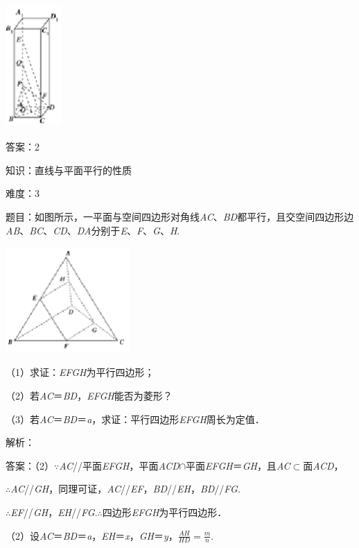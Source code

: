 \documentclass{article} %
\begin{document}
\includegraphics*[width=0.83in, height=1.85in, keepaspectratio=false]{image170}

答案：2

知识：直线与平面平行的性质

难度：3

题目：如图所示，一平面与空间四边形对角线\textit{AC}、\textit{BD}都平行，且交空间四边形边\textit{AB}、\textit{BC}、\textit{CD}、\textit{DA}分别于\textit{E}、\textit{F}、\textit{G}、\textit{H}.

\includegraphics*[width=1.85in, height=1.59in, keepaspectratio=false]{image171}

（1）求证：\textit{EFGH}为平行四边形；

（2）若\textit{AC}＝\textit{BD}，\textit{EFGH}能否为菱形？

（3）若\textit{AC}＝\textit{BD}＝\textit{a}，求证：平行四边形\textit{EFGH}周长为定值．

解析：

答案：（2）$\mathrm{\because}$\textit{AC}//平面\textit{EFGH}，平面\textit{ACD}$\mathrm{\cap}$平面\textit{EFGH}＝\textit{GH}，且\textit{AC}$\mathrm{\subset }$面\textit{ACD}，

$\mathrm{\therefore}$\textit{AC}//\textit{GH}，同理可证，\textit{AC}//\textit{EF}，\textit{BD}//\textit{EH}，\textit{BD}//\textit{FG}.

$\mathrm{\therefore}$\textit{EF}//\textit{GH}，\textit{EH}//\textit{FG}.$\mathrm{\therefore}$四边形\textit{EFGH}为平行四边形．

（2）设\textit{AC}＝\textit{BD}＝\textit{a}，\textit{EH}＝\textit{x}，\textit{GH}＝\textit{y}，$\frac{AH}{HD}=\frac{m}{n}$.
\end{document}
